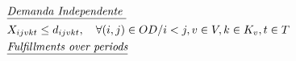 \begin{align}
	 & \textit{\underline{Demanda Independente  }}         \notag                                                                                                                                                                                                                                 \\
	 & X_{ijvkt} \leq d_{ijvkt},  \quad \forall (i,j) \in OD / i < j  ,v \in V, k \in K_v, t\in T                                                                                                  \label{eq: m1_assig_menor_dem}                                                 \\
	 & \textit{\underline{Fulfillments over periods} }   \notag                                                                                                                                                                                                                                    \\

\end{align}

